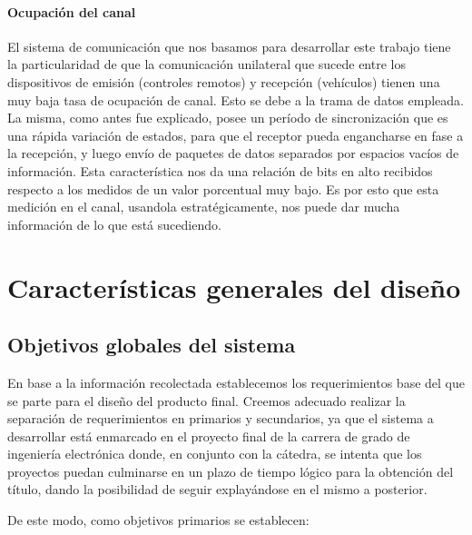 \documentclass[12pt]{report}
\begin{document}
\subsubsection{Ocupación del canal}

El sistema de comunicación que nos basamos para desarrollar este trabajo tiene la particularidad de que la comunicación unilateral que sucede
entre los dispositivos de emisión (controles remotos) y recepción (vehículos) tienen una muy baja tasa de ocupación de canal. Esto se debe a 
la trama de datos empleada. La misma, como antes fue explicado, posee un período de sincronización que es una rápida variación de estados, para
que el receptor pueda engancharse en fase a la recepción, y luego envío de paquetes de datos separados por espacios vacíos de información. Esta
característica nos da una relación de bits en alto recibidos respecto a los medidos de un valor porcentual muy bajo. Es por esto que esta medición
en el canal, usandola estratégicamente, nos puede dar mucha información de lo que está sucediendo.


\chapter{Características generales del diseño}
\section{Objetivos globales del sistema}

En base a la información recolectada establecemos los requerimientos base del que se parte para el diseño del producto final. Creemos adecuado
realizar la separación de requerimientos en primarios y secundarios, ya que el sistema a desarrollar está enmarcado en el proyecto final de la 
carrera de grado de ingeniería electrónica donde, en conjunto con la cátedra, se intenta que los proyectos puedan culminarse en un plazo de 
tiempo lógico para la obtención del título, dando la posibilidad de seguir explayándose en el mismo a posterior. \par

De este modo, como objetivos primarios se establecen:
\end{document}
